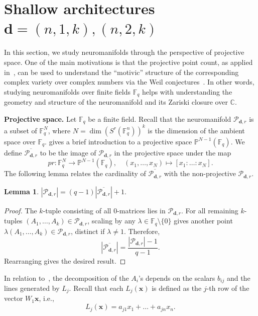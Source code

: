 \documentclass[a4paper]{cas-sc}
\newcommand{\xx}{\textbf{x}}    %
\newcommand{\dd}{\mathbf{d}}    %
\newcommand{\F}{\mathbb{F}}
\newcommand{\C}{\mathbb{C}}     %
\renewcommand{\P}{\mathbb{P}}
\newtheorem{lemma}[theorem]{Lemma}
\begin{document}
\section{Shallow architectures $\dd = (n,1,k), (n,2,k)$} 
\label{sec:shallow-m=1-m=2}

    In this section, we study neuromanifolds through the perspective of projective space. One of the main motivations is that the projective point count, as applied in~\citet{BAEZ25}, can be used to understand the ``motivic'' structure of the corresponding complex variety over complex numbers via the Weil conjectures~\cite{BRYAN26}. In other words, studying neuromanifolds over finite fields $\F_q$ helps with understanding the geometry and structure of the neuromanifold and its Zariski closure over $\C$.

    \noindent
    \textbf{Projective space.} Let $\F_q$ be a finite field. Recall that the neuromanifold $\mathcal{P}_{\dd,r}$ is a subset of $\F_q^N$, where $N=\dim(S^r(\F_q^n))^k$ is the dimension of the ambient space over $\F_q$.  gives a brief introduction to a projective space $\P^{N-1}(\F_q)$. We define $\overline{\mathcal{P}_{\dd,r}}$ to be the image of $\mathcal{P}_{\dd,r}$ in the projective space under the map
    \[
        pr:\F_q^{N}\to \P^{N-1}(\F_q),\quad (x_1,\dots,x_N)\mapsto[x_1:\dots:x_N].
    \] 
    The following lemma relates the cardinality of $\overline{\mathcal{P}_{\dd,r}}$ with the non-projective $\mathcal{P}_{\dd,r}$.
    \begin{lemma} \label{lem: count projective vs non-projective}
            $|\mathcal{P}_{\dd,r}| = (q-1)|\overline{\mathcal{P}_{\dd,r}}|+1.$
    \end{lemma}
    \begin{proof}
        The $k$-tuple consisting of all $0$-matrices lies in $\mathcal{P}_{\dd,r}$. For all remaining $k$-tuples $(A_1, \ldots, A_k) \in \mathcal{P}_{\dd,r}$, scaling by any $\lambda \in \F_q \setminus \{0\}$ gives another point $\lambda(A_1, \ldots, A_k) \in \mathcal{P}_{\dd,r}$, distinct if $\lambda \neq 1$. Therefore,
        \[
            |\overline{\mathcal{P}_{\dd,r}}| = \frac{|\mathcal{P}_{\dd,r}| -1}{q-1}.
        \]
        Rearranging gives the desired result.
    \end{proof}
    
    In relation to~, the decomposition of the $A_i$'s depends on the scalars $b_{ij}$ and the lines generated by $L_j$. Recall that each $L_j(\xx)$ is defined as the $j$-th row of the vector $W_1\xx$, i.e.,
    \[
        L_j(\xx) = a_{j1}x_1+\dots+a_{jn}x_n.
    \]
    
\end{document}
